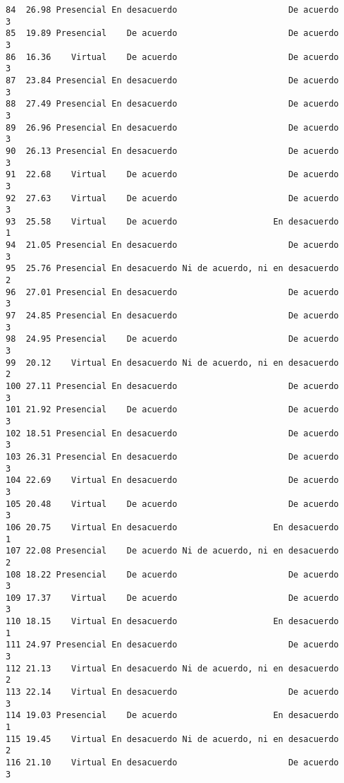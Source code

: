 \documentclass[
  letterpaper,
  DIV=11,
  numbers=noendperiod]{scrartcl}
\begin{document}
\begin{verbatim}
84  26.98 Presencial En desacuerdo                      De acuerdo           3
85  19.89 Presencial    De acuerdo                      De acuerdo           3
86  16.36    Virtual    De acuerdo                      De acuerdo           3
87  23.84 Presencial En desacuerdo                      De acuerdo           3
88  27.49 Presencial En desacuerdo                      De acuerdo           3
89  26.96 Presencial En desacuerdo                      De acuerdo           3
90  26.13 Presencial En desacuerdo                      De acuerdo           3
91  22.68    Virtual    De acuerdo                      De acuerdo           3
92  27.63    Virtual    De acuerdo                      De acuerdo           3
93  25.58    Virtual    De acuerdo                   En desacuerdo           1
94  21.05 Presencial En desacuerdo                      De acuerdo           3
95  25.76 Presencial En desacuerdo Ni de acuerdo, ni en desacuerdo           2
96  27.01 Presencial En desacuerdo                      De acuerdo           3
97  24.85 Presencial En desacuerdo                      De acuerdo           3
98  24.95 Presencial    De acuerdo                      De acuerdo           3
99  20.12    Virtual En desacuerdo Ni de acuerdo, ni en desacuerdo           2
100 27.11 Presencial En desacuerdo                      De acuerdo           3
101 21.92 Presencial    De acuerdo                      De acuerdo           3
102 18.51 Presencial En desacuerdo                      De acuerdo           3
103 26.31 Presencial En desacuerdo                      De acuerdo           3
104 22.69    Virtual En desacuerdo                      De acuerdo           3
105 20.48    Virtual    De acuerdo                      De acuerdo           3
106 20.75    Virtual En desacuerdo                   En desacuerdo           1
107 22.08 Presencial    De acuerdo Ni de acuerdo, ni en desacuerdo           2
108 18.22 Presencial    De acuerdo                      De acuerdo           3
109 17.37    Virtual    De acuerdo                      De acuerdo           3
110 18.15    Virtual En desacuerdo                   En desacuerdo           1
111 24.97 Presencial En desacuerdo                      De acuerdo           3
112 21.13    Virtual En desacuerdo Ni de acuerdo, ni en desacuerdo           2
113 22.14    Virtual En desacuerdo                      De acuerdo           3
114 19.03 Presencial    De acuerdo                   En desacuerdo           1
115 19.45    Virtual En desacuerdo Ni de acuerdo, ni en desacuerdo           2
116 21.10    Virtual En desacuerdo                      De acuerdo           3

\end{verbatim}
\end{document}
